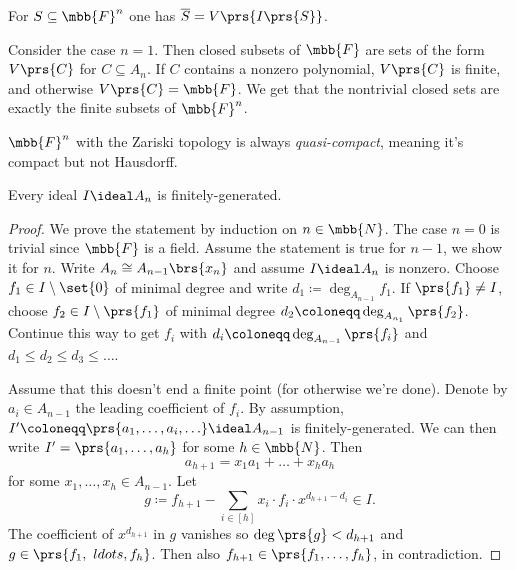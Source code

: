 \documentclass[10pt,a4paper,twoside,openany,hidelinks]{book}
\begin{document}
\begin{exercise}
For $S \subseteq \mbb{F}^n$ one has $\overline{S} = V\prs{I\prs{S}}$.
\end{exercise}

\begin{example}
Consider the case $n=1$. Then closed subsets of $\mbb{F}$ are sets of the form $V\prs{C}$ for $C \subseteq A_n$. If $C$ contains a nonzero polynomial, $V\prs{C}$ is finite, and otherwise $V\prs{C} = \mbb{F}$. We get that the nontrivial closed sets are exactly the finite subsets of $\mbb{F}^n$.
\end{example}

\begin{remark}
$\mbb{F}^n$ with the Zariski topology is always \emph{quasi-compact}, meaning it's compact but not Hausdorff.
\end{remark}

\begin{theorem}\label{theorem:basis_theorem}
Every ideal $I \ideal A_n$ is finitely-generated.
\end{theorem}

\begin{proof}
We prove the statement by induction on $n \in \mbb{N}$. The case $n = 0$ is trivial since $\mbb{F}$ is a field. Assume the statement is true for $n-1$, we show it for $n$.
Write $A_n \cong A_{n-1}\brs{x_n}$ and assume $I \ideal A_n$ is nonzero. Choose $f_1 \in I \setminus \set{0}$ of minimal degree and write $d_1 \coloneqq \deg_{A_{n-1}}{f_1}$. If $\prs{f_1} \neq I$, choose $f_2 \in I\setminus\prs{f_1}$ of minimal degree $d_2 \coloneqq \deg_{A_{n_1}}\prs{f_2}$. Continue this way to get $f_i$ with $d_i \coloneqq \deg_{A_{n-1}}\prs{f_i}$ and $d_1 \leq d_2 \leq d_3 \leq \ldots $.

Assume that this doesn't end a finite point (for otherwise we're done). Denote by $a_i \in A_{n-1}$ the leading coefficient of $f_i$. By assumption, $I' \coloneqq \prs{a_1, \ldots, a_i, \ldots} \ideal A_{n-1}$ is finitely-generated. We can then write $I' = \prs{a_1, \ldots, a_h}$ for some $h \in \mbb{N}$. Then
\[a_{h+1} = x_1 a_1 + \ldots + x_h a_h\]
for some $x_1, \ldots, x_h \in A_{n-1}$.
Let
\[g \coloneqq f_{h+1} - \sum_{i \in [h]} x_i \cdot f_i \cdot x^{d_{h+1} - d_i} \in I \text{.}\]
The coefficient of $x^{d_{h+1}}$ in $g$ vanishes so $\deg\prs{g} < d_{h+1}$ and $g \in \prs{f_1,\ ldots, f_h}$. Then also $f_{h+1} \in \prs{f_1, \ldots, f_h}$, in contradiction.
\end{proof}
\end{document}
